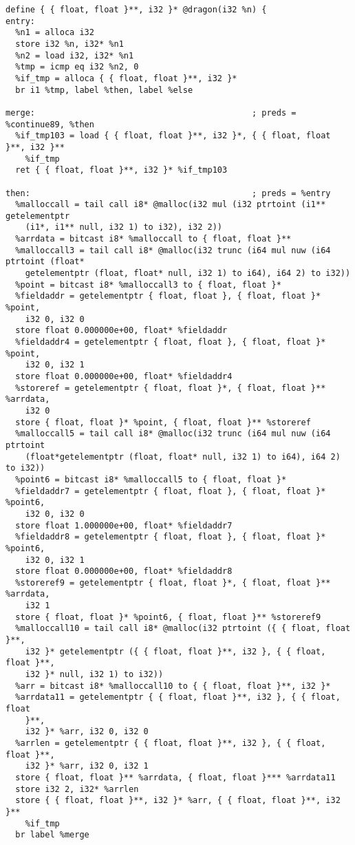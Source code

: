 \documentclass[main.tex]{subfiles}
\begin{document}
{\begin{lstlisting}
define { { float, float }**, i32 }* @dragon(i32 %n) {
entry:
  %n1 = alloca i32
  store i32 %n, i32* %n1
  %n2 = load i32, i32* %n1
  %tmp = icmp eq i32 %n2, 0
  %if_tmp = alloca { { float, float }**, i32 }*
  br i1 %tmp, label %then, label %else

merge:                                            ; preds = %continue89, %then
  %if_tmp103 = load { { float, float }**, i32 }*, { { float, float }**, i32 }**
    %if_tmp
  ret { { float, float }**, i32 }* %if_tmp103

then:                                             ; preds = %entry
  %malloccall = tail call i8* @malloc(i32 mul (i32 ptrtoint (i1** getelementptr 
    (i1*, i1** null, i32 1) to i32), i32 2))
  %arrdata = bitcast i8* %malloccall to { float, float }**
  %malloccall3 = tail call i8* @malloc(i32 trunc (i64 mul nuw (i64 ptrtoint (float*
    getelementptr (float, float* null, i32 1) to i64), i64 2) to i32))
  %point = bitcast i8* %malloccall3 to { float, float }*
  %fieldaddr = getelementptr { float, float }, { float, float }* %point, 
    i32 0, i32 0
  store float 0.000000e+00, float* %fieldaddr
  %fieldaddr4 = getelementptr { float, float }, { float, float }* %point, 
    i32 0, i32 1
  store float 0.000000e+00, float* %fieldaddr4
  %storeref = getelementptr { float, float }*, { float, float }** %arrdata,
    i32 0
  store { float, float }* %point, { float, float }** %storeref
  %malloccall5 = tail call i8* @malloc(i32 trunc (i64 mul nuw (i64 ptrtoint
    (float*getelementptr (float, float* null, i32 1) to i64), i64 2) to i32))
  %point6 = bitcast i8* %malloccall5 to { float, float }*
  %fieldaddr7 = getelementptr { float, float }, { float, float }* %point6,
    i32 0, i32 0
  store float 1.000000e+00, float* %fieldaddr7
  %fieldaddr8 = getelementptr { float, float }, { float, float }* %point6,
    i32 0, i32 1
  store float 0.000000e+00, float* %fieldaddr8
  %storeref9 = getelementptr { float, float }*, { float, float }** %arrdata,
    i32 1
  store { float, float }* %point6, { float, float }** %storeref9
  %malloccall10 = tail call i8* @malloc(i32 ptrtoint ({ { float, float }**,
    i32 }* getelementptr ({ { float, float }**, i32 }, { { float, float }**,
    i32 }* null, i32 1) to i32))
  %arr = bitcast i8* %malloccall10 to { { float, float }**, i32 }*
  %arrdata11 = getelementptr { { float, float }**, i32 }, { { float, float
    }**, 
    i32 }* %arr, i32 0, i32 0
  %arrlen = getelementptr { { float, float }**, i32 }, { { float, float }**,
    i32 }* %arr, i32 0, i32 1
  store { float, float }** %arrdata, { float, float }*** %arrdata11
  store i32 2, i32* %arrlen
  store { { float, float }**, i32 }* %arr, { { float, float }**, i32 }** 
    %if_tmp
  br label %merge


\end{lstlisting}}
\end{document}
